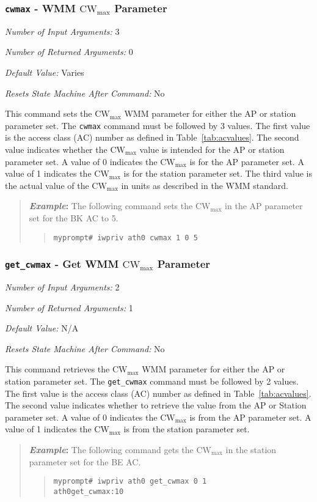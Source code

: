\documentclass[10pt,fullpage]{article}
\newcommand{\mytt}[1]{{\texttt{#1}}}
\newcommand{\bv}{\begin{verse}}
\newcommand{\ev}{\end{verse}}
\newcommand{\cmd}[1]{{\texttt{myprompt\# #1}}}
\newcommand{\argdesc}[4]{\begin{description}
\itemsep -6pt
\item \textit{Number of Input Arguments:} #1
\item \textit{Number of Returned Arguments:} #2
\item \textit{Default Value:} #3
\item \textit{Resets State Machine After Command:} #4
\end{description}
}
\newenvironment{example}{\begin{quote}\textbf{\textit{Example}:}}{\end{quote}}
\begin{document}
\subsubsection{\mytt{cwmax} - WMM $\mathrm{CW}_{\mathrm{max}}$ Parameter}
\argdesc{3}{0}{Varies}{No}
This command sets the $\mathrm{CW}_{\mathrm{max}}$ WMM parameter for
either the AP or station parameter set.  The \mytt{cwmax} command must
be followed by 3 values.  The first value is the access class (AC)
number as defined in Table~\ref{tab:acvalues}.  The second value
indicates whether the $\mathrm{CW}_{\mathrm{max}}$ value is intended
for the AP or station parameter set.  A value of 0 indicates the
$\mathrm{CW}_{\mathrm{max}}$ is for the AP parameter set.  A value of
1 indicates the $\mathrm{CW}_{\mathrm{max}}$ is for the station
parameter set.  The third value is the actual value of the
$\mathrm{CW}_{\mathrm{max}}$ in units as described in the WMM
standard.
\begin{example}
The following command sets the $\mathrm{CW}_{\mathrm{max}}$ in the
AP parameter set for the BK AC to 5.
\bv
\cmd{iwpriv ath0 cwmax 1 0 5}
\ev
\end{example}

\subsubsection{\mytt{get\_cwmax} - Get WMM $\mathrm{CW}_{\mathrm{max}}$ Parameter}
\argdesc{2}{1}{N/A}{No}
This command retrieves the $\mathrm{CW}_{\mathrm{max}}$ WMM parameter
for either the AP or station parameter set. The \mytt{get\_cwmax}
command must be followed by 2 values.  The first value is the access
class (AC) number as defined in Table~\ref{tab:acvalues}.  The second
value indicates whether to retrieve the value from the AP or Station
parameter set. A value of 0 indicates the $\mathrm{CW}_{\mathrm{max}}$
is from the AP parameter set.  A value of 1 indicates the
$\mathrm{CW}_{\mathrm{max}}$ is from the station parameter set.
\begin{example}
  The following command gets the $\mathrm{CW}_{\mathrm{max}}$ in the
  station parameter set for the BE AC.
  \bv
  \cmd{iwpriv ath0 get\_cwmax 0 1}\\
  \mytt{ath0\hspace{32pt}get\_cwmax:10}
  \ev
\end{example}
\end{document}
